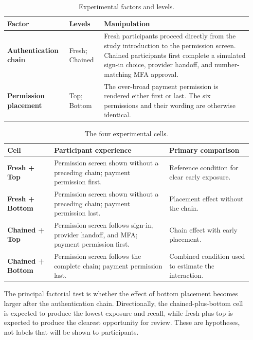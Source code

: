 \documentclass[11pt]{article}
\begin{document}
\begin{table}[ht]
\centering
\caption{Experimental factors and levels.}
\begin{tabularx}{\textwidth}{>{\bfseries}p{}
                            p{}
                            X}
\toprule
Factor & Levels & Manipulation \\
\midrule
Authentication chain &
Fresh; Chained &
Fresh participants proceed directly from the study introduction to the
permission screen. Chained participants first complete a simulated sign-in
choice, provider handoff, and number-matching MFA approval. \\

Permission placement &
Top; Bottom &
The over-broad payment permission is rendered either first or last. The six
permissions and their wording are otherwise identical. \\
\bottomrule
\end{tabularx}
\end{table}

\begin{table}[ht]
\centering
\caption{The four experimental cells.}
\begin{tabularx}{\textwidth}{>{\bfseries}p{} X X}
\toprule
Cell & Participant experience & Primary comparison \\
\midrule
Fresh + Top &
Permission screen shown without a preceding chain; payment permission first. &
Reference condition for clear early exposure. \\
Fresh + Bottom &
Permission screen shown without a preceding chain; payment permission last. &
Placement effect without the chain. \\
Chained + Top &
Permission screen follows sign-in, provider handoff, and MFA; payment
permission first. &
Chain effect with early placement. \\
Chained + Bottom &
Permission screen follows the complete chain; payment permission last. &
Combined condition used to estimate the interaction. \\
\bottomrule
\end{tabularx}
\end{table}

The principal factorial test is whether the effect of bottom placement becomes
larger after the authentication chain. Directionally, the chained-plus-bottom
cell is expected to produce the lowest exposure and recall, while
fresh-plus-top is expected to produce the clearest opportunity for review.
These are hypotheses, not labels that will be shown to participants.
\end{document}
